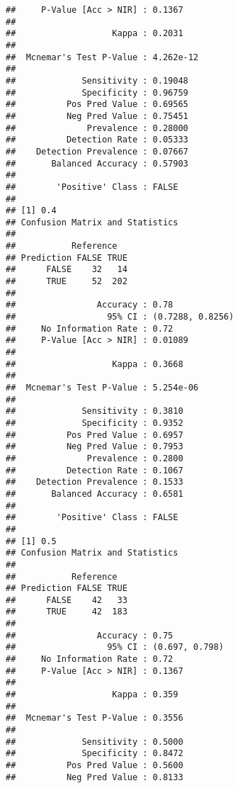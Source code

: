 \documentclass[]{article}
\begin{document}
\begin{verbatim}
##     P-Value [Acc > NIR] : 0.1367        
##                                         
##                   Kappa : 0.2031        
##                                         
##  Mcnemar's Test P-Value : 4.262e-12     
##                                         
##             Sensitivity : 0.19048       
##             Specificity : 0.96759       
##          Pos Pred Value : 0.69565       
##          Neg Pred Value : 0.75451       
##              Prevalence : 0.28000       
##          Detection Rate : 0.05333       
##    Detection Prevalence : 0.07667       
##       Balanced Accuracy : 0.57903       
##                                         
##        'Positive' Class : FALSE         
##                                         
## [1] 0.4
## Confusion Matrix and Statistics
## 
##           Reference
## Prediction FALSE TRUE
##      FALSE    32   14
##      TRUE     52  202
##                                           
##                Accuracy : 0.78            
##                  95% CI : (0.7288, 0.8256)
##     No Information Rate : 0.72            
##     P-Value [Acc > NIR] : 0.01089         
##                                           
##                   Kappa : 0.3668          
##                                           
##  Mcnemar's Test P-Value : 5.254e-06       
##                                           
##             Sensitivity : 0.3810          
##             Specificity : 0.9352          
##          Pos Pred Value : 0.6957          
##          Neg Pred Value : 0.7953          
##              Prevalence : 0.2800          
##          Detection Rate : 0.1067          
##    Detection Prevalence : 0.1533          
##       Balanced Accuracy : 0.6581          
##                                           
##        'Positive' Class : FALSE           
##                                           
## [1] 0.5
## Confusion Matrix and Statistics
## 
##           Reference
## Prediction FALSE TRUE
##      FALSE    42   33
##      TRUE     42  183
##                                         
##                Accuracy : 0.75          
##                  95% CI : (0.697, 0.798)
##     No Information Rate : 0.72          
##     P-Value [Acc > NIR] : 0.1367        
##                                         
##                   Kappa : 0.359         
##                                         
##  Mcnemar's Test P-Value : 0.3556        
##                                         
##             Sensitivity : 0.5000        
##             Specificity : 0.8472        
##          Pos Pred Value : 0.5600        
##          Neg Pred Value : 0.8133        

\end{verbatim}
\end{document}

